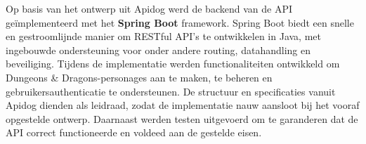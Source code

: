 Op basis van het ontwerp uit Apidog werd de backend van de API geïmplementeerd met het \textbf{Spring Boot} framework. Spring Boot biedt een snelle en gestroomlijnde manier om RESTful API’s te ontwikkelen in Java, met ingebouwde ondersteuning voor onder andere routing, datahandling en beveiliging. Tijdens de implementatie werden functionaliteiten ontwikkeld om Dungeons \& Dragons-personages aan te maken, te beheren en gebruikersauthenticatie te ondersteunen. De structuur en specificaties vanuit Apidog dienden als leidraad, zodat de implementatie nauw aansloot bij het vooraf opgestelde ontwerp. Daarnaast werden testen uitgevoerd om te garanderen dat de API correct functioneerde en voldeed aan de gestelde eisen.


